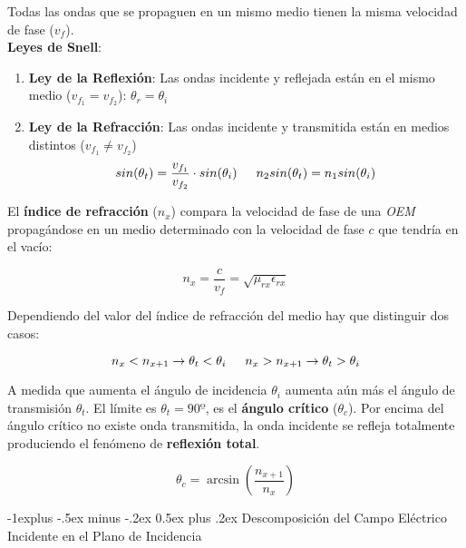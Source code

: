 \documentclass[10pt,landscape]{article}
\makeatletter
\renewcommand{\subsection}{\@startsection{subsection}{2}{0mm}%
                                {-1explus -.5ex minus -.2ex}%
                                {0.5ex plus .2ex}%
                                {\normalfont\normalsize\bfseries}}
\makeatother
\begin{document}
\begin{multicols}{3}
Todas las ondas que se propaguen en un mismo medio tienen la misma velocidad de fase ($v_f$). \\

\textbf{Leyes de Snell}:

\begin{enumerate}
    \item \textbf{Ley de la Reflexión}: Las ondas incidente y reflejada están en el mismo medio ($v_{f_1} = v_{f_2}$): $\theta_r = \theta_i$
        
    \item \textbf{Ley de la Refracción}: Las ondas incidente y transmitida están en medios distintos ($v_{f_1} \neq v_{f_2}$) 
        \begin{equation*}
            sin(\theta_t) = \frac{v_{f_1}}{v_{f_2}} \cdot sin(\theta_i) \hspace{15 pt} n_2 sin(\theta_t) = n_1 sin(\theta_i)
        \end{equation*}
\end{enumerate}

El \textbf{índice de refracción} ($n_x$) compara la velocidad de fase de una \textit{OEM} propagándose en un medio determinado con la velocidad de fase $c$ que tendría en el vacío:

\begin{equation*}
	n_x = \frac{c}{v_f} = \sqrt{\mu_{rx} \epsilon_{rx}}
\end{equation*}

Dependiendo del valor del índice de refracción del medio hay que distinguir dos casos:

\begin{equation*}
	n_x < n_{x+1} \rightarrow \theta_t < \theta_i \hspace{15 pt} n_x > n_{x+1} \rightarrow \theta_t > \theta_i
\end{equation*}

A medida que aumenta el ángulo de incidencia $\theta_i$ aumenta aún más el ángulo de transmisión $\theta_t$. El límite es $\theta_t = 90º$, es el \textbf{ángulo crítico} ($\theta_c$). Por encima del ángulo crítico no existe onda transmitida, la onda incidente se refleja totalmente produciendo el fenómeno de \textbf{reflexión total}.

\begin{equation*}
    \theta_c = \arcsin \left( \frac{n_{x+1}}{n_x} \right)
\end{equation*}

\subsection{Descomposición del Campo Eléctrico Incidente en el Plano de Incidencia}


\end{multicols}
\end{document}
